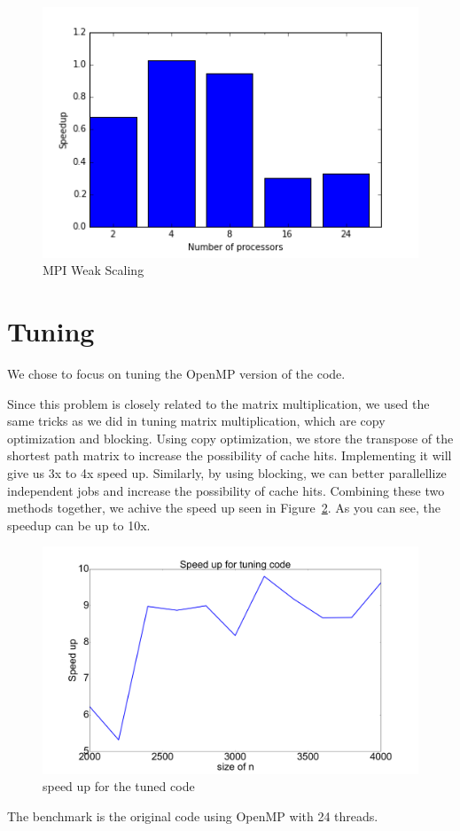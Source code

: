 \documentclass[11pt]{article}
\begin{document}
\begin{figure}
\caption{MPI Weak Scaling}
\label{mpi-weak-scaling}
\includegraphics{../results/mpi_weak.png}
\end{figure}

\section*{Tuning}
    We chose to focus on tuning the OpenMP version of the code.

    Since this problem is closely related to the matrix multiplication, we used the same tricks as we did in tuning matrix multiplication, which are copy optimization and blocking. Using copy optimization, we store the transpose of the shortest path matrix to increase the possibility of cache hits. Implementing it will give us 3x to 4x speed up. Similarly, by using blocking, we can better parallellize independent jobs and increase the possibility of cache hits. Combining these two methods together, we achive the speed up seen in Figure~\ref{su}. As you can see, the speedup can be up to 10x.

    \begin{figure}
    \caption{speed up for the tuned code}
    \label{su}
    \includegraphics[height=0.4\textwidth, width=\textwidth]{speed_up.png}
    \end{figure}

	The benchmark is the original code using OpenMP with 24 threads.
\end{document}
